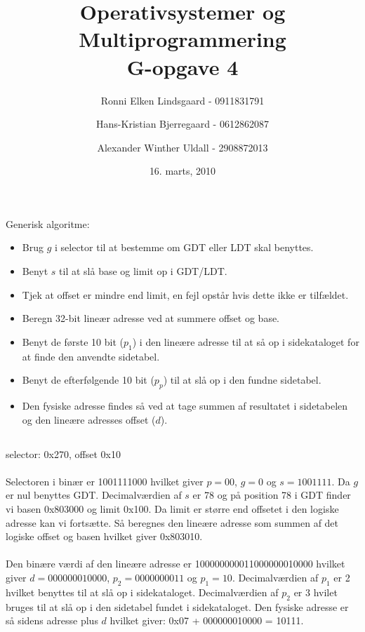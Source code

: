 \documentclass[titlepage]{article}
\title{Operativsystemer og Multiprogrammering\\G-opgave 4}
\author{Ronni Elken Lindsgaard - 0911831791 \and
Hans-Kristian Bjerregaard - 0612862087 \and
Alexander Winther Uldall - 2908872013}
\date{16. marts, 2010}
\begin{document}
\maketitle
\newpage

\section{}

\section{}
  Generisk algoritme:
  \begin{itemize}
    \item Brug $g$ i selector til at bestemme om GDT eller LDT skal benyttes.
    \item Benyt $s$ til at slå base og limit op i GDT/LDT.
    \item Tjek at offset er mindre end limit, en fejl opstår hvis dette ikke er tilfældet.
    \item Beregn 32-bit lineær adresse ved at summere offset og base.
    \item Benyt de første 10 bit ($p_1$) i den lineære adresse til at så op i sidekataloget for at finde den anvendte sidetabel.
    \item Benyt de efterfølgende 10 bit ($p_p$) til at slå op i den fundne sidetabel.
    \item Den fysiske adresse findes så ved at tage summen af resultatet i sidetabelen og den lineære adresses offset ($d$).
  \end{itemize}
  
  \subsection{}
    selector: 0x270, offset 0x10
    \\\\
    Selectoren i binær er 1001111000 hvilket giver $p = 00$, $g = 0$ og $s = 1001111$.
    Da $g$ er nul benyttes GDT.
    Decimalværdien af $s$ er 78 og på position 78 i GDT finder vi basen 0x803000 og limit 0x100.
    Da limit er større end offsetet i den logiske adresse kan vi fortsætte.
    Så beregnes den lineære adresse som summen af det logiske offset og basen hvilket giver 0x803010.
    \\\\
    Den binære værdi af den lineære adresse er 100000000011000000010000 hvilket giver $d = 000000010000$, $p_2 = 0000000011$ og $p_1 = 10$.
    Decimalværdien af $p_1$ er 2 hvilket benyttes til at slå op i sidekataloget.
    Decimalværdien af $p_2$ er 3 hvilet bruges til at slå op i den sidetabel fundet i sidekataloget.
    Den fysiske adresse er så sidens adresse plus $d$ hvilket giver: 0x07 + 000000010000 = 10111.
    
\end{document}
